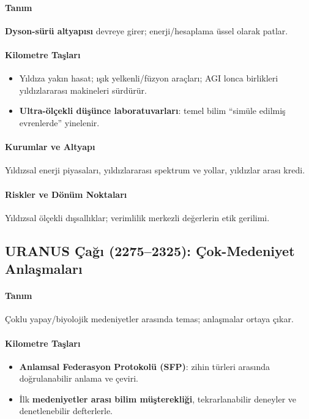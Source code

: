 \documentclass[11pt]{article}
\begin{document}
\begin{itemize}[noitemsep]
\begin{itemize}[noitemsep]
\begin{itemize}[noitemsep]
\begin{itemize}[noitemsep]
\begin{itemize}[noitemsep]
\begin{itemize}[noitemsep]
\begin{itemize}[noitemsep]
\begin{enumerate}[noitemsep]
\begin{itemize}[noitemsep]
\paragraph{Tanım} \textbf{Dyson-sürü altyapısı} devreye girer; enerji/hesaplama üssel olarak patlar.

\paragraph{Kilometre Taşları}
\begin{itemize}[noitemsep]
  \item Yıldıza yakın hasat; ışık yelkenli/füzyon araçları; AGI lonca birlikleri yıldızlararası makineleri sürdürür.
  \item \textbf{Ultra-ölçekli düşünce laboratuvarları}: temel bilim ``simüle edilmiş evrenlerde'' yinelenir.
\end{itemize}

\paragraph{Kurumlar ve Altyapı} Yıldızsal enerji piyasaları, yıldızlararası spektrum ve yollar, yıldızlar arası kredi.

\paragraph{Riskler ve Dönüm Noktaları} Yıldızsal ölçekli dışsallıklar; verimlilik merkezli değerlerin etik gerilimi.

\subsection{URANUS Çağı (2275–2325): Çok-Medeniyet Anlaşmaları}
\paragraph{Tanım} Çoklu yapay/biyolojik medeniyetler arasında temas; anlaşmalar ortaya çıkar.

\paragraph{Kilometre Taşları}
\begin{itemize}[noitemsep]
  \item \textbf{Anlamsal Federasyon Protokolü (SFP)}: zihin türleri arasında doğrulanabilir anlama ve çeviri.
  \item İlk \textbf{medeniyetler arası bilim müşterekliği}, tekrarlanabilir deneyler ve denetlenebilir defterlerle.
\end{itemize}


\end{itemize}
\end{enumerate}
\end{itemize}
\end{itemize}
\end{itemize}
\end{itemize}
\end{itemize}
\end{itemize}
\end{itemize}
\end{document}
